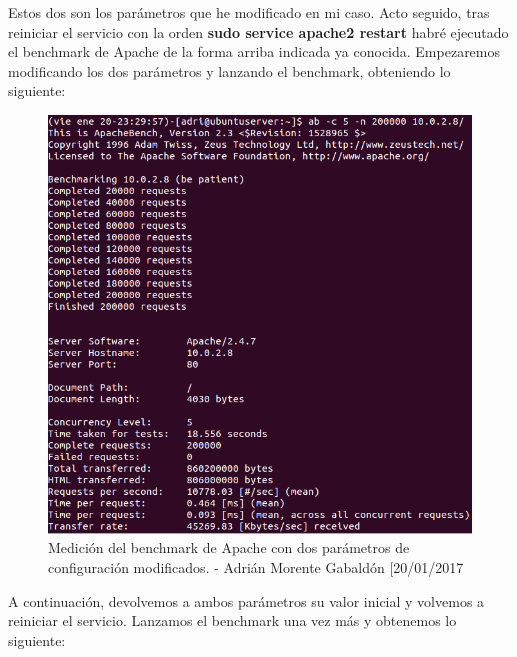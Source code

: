 Estos dos son los parámetros que he modificado en mi caso. Acto seguido, tras reiniciar el servicio con la orden \textbf{sudo service apache2 restart} habré ejecutado el benchmark de Apache de la forma arriba indicada ya conocida. Empezaremos modificando los dos parámetros y lanzando el benchmark, obteniendo lo siguiente:
\begin{figure}[H]
	\centering
	\includegraphics[scale=0.5]{ab-primero}
	\caption{Medición del benchmark de Apache con dos parámetros de configuración modificados. - Adrián Morente Gabaldón [20/01/2017}
	\label{figura20}
\end{figure}
A continuación, devolvemos a ambos parámetros su valor inicial y volvemos a reiniciar el servicio. Lanzamos el benchmark una vez más y obtenemos lo siguiente:
